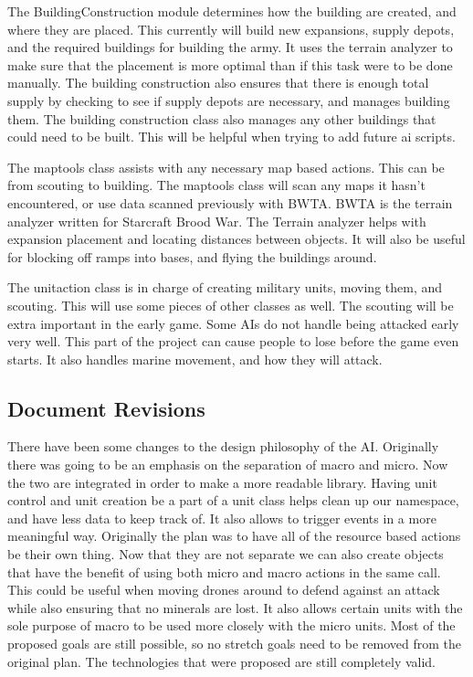 \documentclass[10pt,letterpaper,onecolumn,draftclsnofoot]{IEEEtran}
\begin{document}
	The BuildingConstruction module determines how the building are created, and where they are placed. This currently will build new expansions, supply depots, and the required buildings for building the army. It uses the terrain analyzer to make sure that the placement is more optimal than if this task were to be done manually. The building construction also ensures that there is enough total supply by checking to see if supply depots are necessary, and manages building them. The building construction class also manages any other buildings that could need to be built. This will be helpful when trying to add future ai scripts. 
	
	The maptools class assists with any necessary map based actions. This can be from scouting to building. The maptools class will scan any maps it hasn't encountered, or use data scanned previously with BWTA. BWTA is the terrain analyzer written for Starcraft Brood War. The Terrain analyzer helps with expansion placement and locating distances between objects. It will also be useful for blocking off ramps into bases, and flying the buildings around. 
	
	The unitaction class is in charge of creating military units, moving them, and scouting. This will use some pieces of other classes as well. The scouting will be extra important in the early game. Some AIs do not handle being attacked early very well. This part of the project can cause people to lose before the game even starts. It also handles marine movement, and how they will attack. 
	
	\subsection{Document Revisions}
	There have been some changes to the design philosophy of the AI. Originally there was going to be an emphasis on the separation of macro and micro. Now the two are integrated in order to make a more readable library. Having unit control and unit creation be a part of a unit class helps clean up our namespace, and have less data to keep track of. It also allows to trigger events in a more meaningful way. Originally the plan was to have all of the resource based actions be their own thing. Now that they are not separate we can also create objects that have the benefit of using both micro and macro actions in the same call. This could be useful when moving drones around to defend against an attack while also ensuring that no minerals are lost. It also allows certain units with the sole purpose of macro to be used more closely with the micro units. Most of the proposed goals are still possible, so no stretch goals need to be removed from the original plan. The technologies that were proposed are still completely valid.
\end{document}
